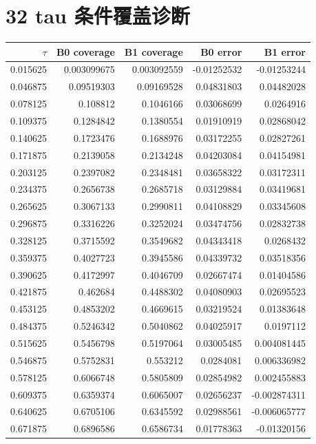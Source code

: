 \documentclass[UTF8,11pt,fontset=windows]{ctexart}
\begin{document}
\section*{32 tau 条件覆盖诊断}\small\begin{longtable}{rrrrr}\toprule $\tau$ & B0 coverage & B1 coverage & B0 error & B1 error\\\midrule\endhead
0.015625 & 0.003099675 & 0.003092559 & -0.01252532 & -0.01253244 \\
0.046875 & 0.09519303 & 0.09169528 & 0.04831803 & 0.04482028 \\
0.078125 & 0.108812 & 0.1046166 & 0.03068699 & 0.0264916 \\
0.109375 & 0.1284842 & 0.1380554 & 0.01910919 & 0.02868042 \\
0.140625 & 0.1723476 & 0.1688976 & 0.03172255 & 0.02827261 \\
0.171875 & 0.2139058 & 0.2134248 & 0.04203084 & 0.04154981 \\
0.203125 & 0.2397082 & 0.2348481 & 0.03658322 & 0.03172311 \\
0.234375 & 0.2656738 & 0.2685718 & 0.03129884 & 0.03419681 \\
0.265625 & 0.3067133 & 0.2990811 & 0.04108829 & 0.03345608 \\
0.296875 & 0.3316226 & 0.3252024 & 0.03474756 & 0.02832738 \\
0.328125 & 0.3715592 & 0.3549682 & 0.04343418 & 0.0268432 \\
0.359375 & 0.4027723 & 0.3945586 & 0.04339732 & 0.03518356 \\
0.390625 & 0.4172997 & 0.4046709 & 0.02667474 & 0.01404586 \\
0.421875 & 0.462684 & 0.4488302 & 0.04080903 & 0.02695523 \\
0.453125 & 0.4853202 & 0.4669615 & 0.03219524 & 0.01383648 \\
0.484375 & 0.5246342 & 0.5040862 & 0.04025917 & 0.0197112 \\
0.515625 & 0.5456798 & 0.5197064 & 0.03005485 & 0.004081445 \\
0.546875 & 0.5752831 & 0.553212 & 0.0284081 & 0.006336982 \\
0.578125 & 0.6066748 & 0.5805809 & 0.02854982 & 0.002455883 \\
0.609375 & 0.6359374 & 0.6065007 & 0.02656237 & -0.002874311 \\
0.640625 & 0.6705106 & 0.6345592 & 0.02988561 & -0.006065777 \\
0.671875 & 0.6896586 & 0.6586734 & 0.01778363 & -0.01320156 \\

\end{longtable}
\end{document}
